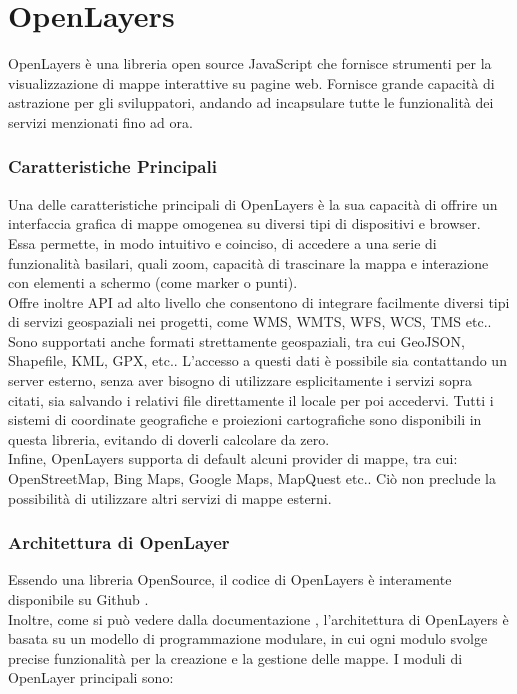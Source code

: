 \section{OpenLayers}

OpenLayers è una libreria open source JavaScript che fornisce strumenti per la visualizzazione di mappe interattive su pagine web. Fornisce grande capacità di astrazione per gli sviluppatori, andando ad incapsulare tutte le funzionalità dei servizi menzionati fino ad ora.

\subsubsection{Caratteristiche Principali}
Una delle caratteristiche principali di OpenLayers è la sua capacità di offrire un interfaccia grafica di mappe omogenea su diversi tipi di dispositivi e browser. Essa permette, in modo intuitivo e coinciso, di accedere a una serie di funzionalità basilari, quali zoom, capacità di trascinare la mappa e interazione con elementi a schermo (come marker o punti).
\\Offre inoltre API ad alto livello che consentono di integrare facilmente diversi tipi di servizi geospaziali nei progetti, come WMS, WMTS, WFS, WCS, TMS etc..
Sono supportati anche formati strettamente geospaziali, tra cui GeoJSON, Shapefile, KML, GPX, etc.. L'accesso a questi dati è possibile sia contattando un server esterno, senza aver bisogno di utilizzare esplicitamente i servizi sopra citati, sia salvando i relativi file direttamente il locale per poi accedervi.
Tutti i sistemi di coordinate geografiche e proiezioni cartografiche sono disponibili in questa libreria, evitando di doverli calcolare da zero.
\\Infine, OpenLayers supporta di default alcuni provider di mappe, tra cui: OpenStreetMap, Bing Maps, Google Maps, MapQuest etc.. Ciò non preclude la possibilità di utilizzare altri servizi di mappe esterni.

\subsubsection{Architettura di OpenLayer}

Essendo una libreria OpenSource, il codice di OpenLayers è interamente disponibile su Github \cite{GithubOpenLayers}.
\\Inoltre, come si può vedere dalla documentazione \cite{DocumentazioneOpenLayers}, l'architettura di OpenLayers è basata su un modello di programmazione modulare, in cui ogni modulo svolge precise funzionalità per la creazione e la gestione delle mappe. I moduli di OpenLayer principali sono:

